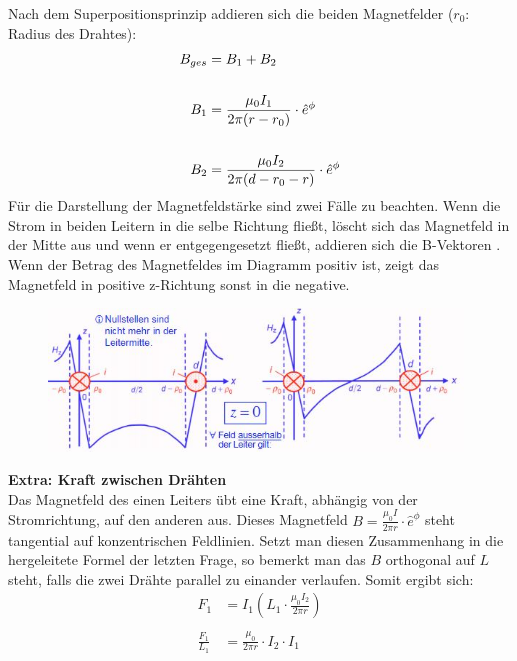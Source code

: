 \documentclass[a4paper, 11pt, ngerman, parskip=half-]{scrartcl}
\begin{document}
Nach dem Superpositionsprinzip addieren sich die beiden Magnetfelder ($r_0$: Radius des Drahtes):
\begin{align}
    B_{ges} & =B_1 + B_2 \notag                                                 \\
    \notag                                                                      \\
    B_1     & = \frac{\mu_0 I_1}{2 \pi (r -r_0)} \cdot \hat{e}^{\phi} \notag    \\
    \notag                                                                      \\
    B_2     & = \frac{\mu_0 I_2}{2 \pi (d-r_0 - r)} \cdot \hat{e}^{\phi} \notag
\end{align}
Für die Darstellung der Magnetfeldstärke sind zwei Fälle zu beachten. Wenn die Strom in beiden Leitern in die selbe Richtung fließt, löscht sich das Magnetfeld in der Mitte aus und wenn er entgegengesetzt fließt, addieren sich die B-Vektoren .
Wenn der Betrag des Magnetfeldes im Diagramm positiv ist, zeigt das Magnetfeld in positive z-Richtung sonst in die negative.
\begin{figure}
    \centering
    \includegraphics[width=11cm]{image/05/5.4.jpg}
\end{figure}
\textbf{Extra: Kraft zwischen Drähten}\\
Das Magnetfeld des einen Leiters übt eine Kraft, abhängig von der Stromrichtung, auf den anderen aus.
Dieses Magnetfeld  $B = \frac{\mu_0 I}{2 \pi r} \cdot \hat{e}^{\phi}$ steht tangential auf konzentrischen Feldlinien.
Setzt man diesen Zusammenhang in die hergeleitete Formel der letzten Frage, so bemerkt man das $B$ orthogonal auf $L$ steht, falls die zwei Drähte parallel zu einander verlaufen.
Somit ergibt sich:
\begin{align}
    F_1             & = I_1(L_1 \cdot \frac{\mu_0 I_2}{2 \pi r} ) \\
    \\
    \frac{F_1}{L_1} & = \frac{\mu_0}{2 \pi r} \cdot I_2 \cdot I_1
\end{align}
\newpage
\end{document}
